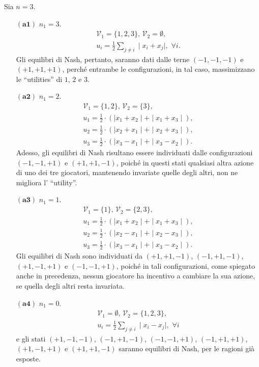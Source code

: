 \documentclass[11pt,largemargins]{homework}
\begin{document}
\begin{alphaparts}
\questionpart
Sia $n=3$.
  \begin{itemize}
  \item[$\left(\textbf{a1}\right)$]  $n_{1}=3$.
  \begin{align*}
  \mathcal{V}_{1}=\{1,2,3\}, \, \mathcal{V}_{2}=\emptyset, \\
   u_{i}=\frac{1}{2}\sum_{j\neq i}\mid x_{i}+x_{j}\mid, \,\, \forall i.
  \end{align*}
  Gli equilibri di Nash, pertanto, saranno dati dalle terne $\left(-1,-1,-1\right)$ e $\left(+1,+1,+1\right)$, perché entrambe le configurazioni, in tal caso, massimizzano le ``utilities'' di $1$, $2$ e $3$.
  
  \item[$\left(\textbf{a2}\right)$] $n_{1}=2$.
  \begin{align*}
  \mathcal{V}_{1}=\{1,2\}, \, \mathcal{V}_{2}=\{3\},\\
  u_{1}=\frac{1}{2}\cdot \left(\mid x_{1}+x_{2}\mid + \mid x_{1}+x_{3}\mid\right), \\ u_{2}=\frac{1}{2}\cdot \left(\mid x_{2}+x_{1}\mid + \mid x_{2}+x_{3}\mid\right), \\ u_{3}=\frac{1}{2}\cdot \left(\mid x_{3}-x_{1}\mid + \mid x_{3}-x_{2}\mid\right).
  \end{align*}
  Adesso, gli equilibri di Nash risultano essere individuati dalle configurazioni $\left(-1,-1,+1\right)$ e $\left(+1,+1,-1\right)$, poiché in questi stati qualsiasi altra azione di uno dei tre giocatori, mantenendo invariate quelle degli altri, non ne migliora l' ``utility''.
  \item[$\left(\textbf{a3}\right)$]  $n_{1}=1$.
  \begin{align*}
  \mathcal{V}_{1}=\{1\},\, \mathcal{V}_{2}=\{2,3\},\\
  u_{1}=\frac{1}{2}\cdot \left(\mid x_{1}+x_{2}\mid + \mid x_{1}+x_{3}\mid\right), \\
  u_{2}=\frac{1}{2}\cdot \left(\mid x_{2}-x_{1}\mid + \mid x_{2}-x_{3}\mid\right), \\
  u_{3}=\frac{1}{2}\cdot \left(\mid x_{3}-x_{1}\mid + \mid x_{3}-x_{2}\mid\right).
  \end{align*}
  Gli equilibri di Nash sono individuati da $\left(+1,+1,-1\right)$, $\left(-1,+1,-1\right)$, $\left(+1,-1,+1\right)$ e $\left(-1,-1,+1\right)$, poiché in tali configurazioni, come spiegato anche in precedenza, nessun giocatore ha incentivo a cambiare la sua azione, se quella degli altri resta invariata.
  \item[$\left(\textbf{a4}\right)$] $n_{1}=0$.
  \begin{align*}
  \mathcal{V}_{1}=\emptyset, \, \mathcal{V}_{2}=\{1,2,3\},\\
  u_{i}=\frac{1}{2}\sum_{j\neq i}\mid x_{i}-x_{j}\mid, \,\, \forall i
  \end{align*}
  e gli stati $\left(+1,-1,-1\right)$, $\left(-1,+1,-1\right)$, $\left(-1,-1,+1\right)$, $\left(-1,+1,+1\right)$, $\left(+1,-1,+1\right)$ e $\left(+1,+1,-1\right)$ saranno equilibri di Nash, per le ragioni già esposte.
  \end{itemize}
  

\end{alphaparts}
\end{document}

